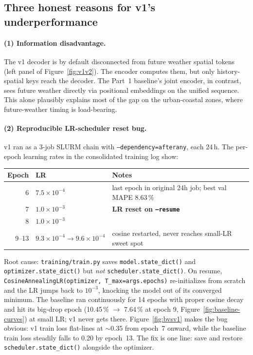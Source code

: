 \documentclass[11pt,letterpaper]{article}
\begin{document}
\subsection{Three honest reasons for v1's underperformance}
\label{sec:archsearch-reasons}

\paragraph{(1) Information disadvantage.} The v1 decoder is by default disconnected from future weather spatial tokens (left panel of Figure~\ref{fig:v1v2}). The encoder computes them, but only history-spatial keys reach the decoder. The Part~1 baseline's joint encoder, in contrast, sees future weather directly via positional embeddings on the unified sequence. This alone plausibly explains most of the gap on the urban-coastal zones, where future-weather timing is load-bearing.

\paragraph{(2) Reproducible LR-scheduler reset bug.} v1 ran as a 3-job SLURM chain with \texttt{--dependency=afterany}, each 24\,h. The per-epoch learning rates in the consolidated training log show:

\begin{table}[!h]
\centering
\small
\begin{tabular}{@{}rll@{}}
\toprule
Epoch & LR & Notes \\
\midrule
6  & $7.5\!\times\!10^{-4}$ & last epoch in original 24h job; best val MAPE 8.63\,\% \\
7  & $1.0\!\times\!10^{-3}$ & \textbf{LR reset on \texttt{--resume}} \\
8  & $1.0\!\times\!10^{-3}$ & \\
9--13 & $9.3\!\times\!10^{-4}\to 9.6\!\times\!10^{-4}$ & cosine restarted, never reaches small-LR sweet spot \\
\bottomrule
\end{tabular}
\end{table}

Root cause: \texttt{training/train.py} saves \texttt{model.state\_dict()} and \texttt{optimizer.state\_dict()} but \emph{not} \texttt{scheduler.state\_dict()}. On resume, \texttt{CosineAnnealingLR(optimizer, T\_max=args.epochs)} re-initializes from scratch and the LR jumps back to $10^{-3}$, knocking the model out of its converged minimum. The baseline ran continuously for 14 epochs with proper cosine decay and hit its big-drop epoch (10.45\,\% $\to$ 7.64\,\% at epoch 9, Figure~\ref{fig:baseline-curves}) at small LR; v1 never gets there. Figure~\ref{fig:bvsv1} makes the bug obvious: v1 train loss flat-lines at $\sim$0.35 from epoch~7 onward, while the baseline train loss steadily falls to 0.20 by epoch~13. The fix is one line: save and restore \texttt{scheduler.state\_dict()} alongside the optimizer.
\end{document}
